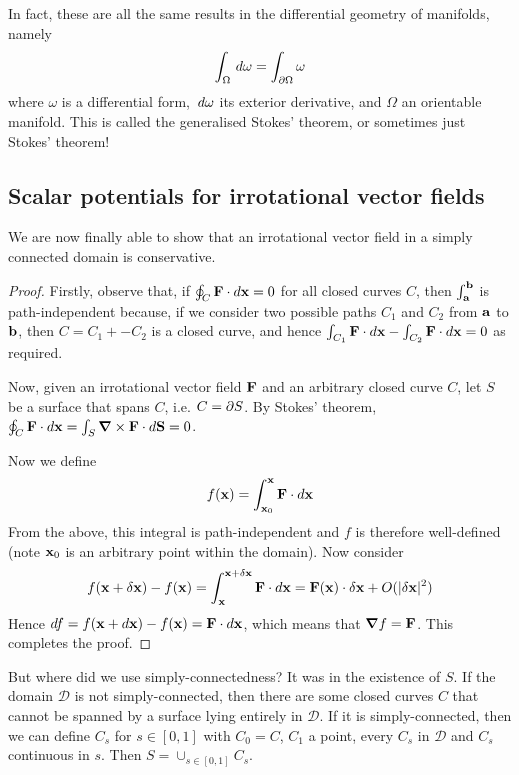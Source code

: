 \documentclass{../template/note}
\begin{document}
    In fact, these are all the same results in the differential geometry of manifolds, namely
    \begin{align*}
        \int_\Omega \,d{\omega} = \int_{\partial \Omega} \omega 
    \end{align*}
    where \(\omega\) is a differential form, \(\,d{\omega}\) its exterior derivative, and \(\Omega\) an orientable manifold. This is called the generalised Stokes' theorem, or sometimes just Stokes' theorem!
    
    \subsection{Scalar potentials for irrotational vector fields}

    We are now finally able to show that an irrotational vector field in a simply connected domain is conservative.

    \begin{proof}
        Firstly, observe that, if \(\oint_C \V F \cdot d\V x = 0\) for all closed curves \(C\), then \(\int_{\V a}^{\V b}\) is path-independent because, if we consider two possible paths \(C_1\) and \(C_2\) from \(\V a\) to \(\V b\), then \(C = C_1 + -C_2\) is a closed curve, and hence \(\int_{C_1} \V F \cdot d\V x - \int_{C_2} \V F \cdot d\V x = 0\) as required.

        Now, given an irrotational vector field \(\V F\) and an arbitrary closed curve \(C\), let \(S\) be a surface that spans \(C\), i.e. \(C = \partial S\). By Stokes' theorem, \(\oint_C \V F \cdot d\V x = \int_S \curl \V F \cdot d\V S = 0\).

        Now we define
        \begin{align*}
            f(\V x) = \int_{\V x_0}^{\V x} \V F \cdot d\V x
        \end{align*}
        From the above, this integral is path-independent and \(f\) is therefore well-defined (note \(\V x_0\) is an arbitrary point within the domain). Now consider
        \begin{align*}
            f(\V x + \delta \V x) - f(\V x) = \int_{\V x}^{\V x + \delta \V x} \V F \cdot d\V x = \V F(\V x) \cdot \delta \V x + O(|\delta \V x|^2)
        \end{align*}
        Hence \(df = f(\V x + d\V x) - f(\V x) = \V F \cdot d\V x\), which means that \(\grad f = \V F\). This completes the proof.
    \end{proof}
    
    \begin{remark*}
        But where did we use simply-connectedness? It was in the existence of \(S\). If the domain \(\mathscr D\) is not simply-connected, then there are some closed curves \(C\) that cannot be spanned by a surface lying entirely in \(\mathscr D\). If it is simply-connected, then we can define \(C_s\) for \(s \in [0, 1]\) with \(C_0 = C\), \(C_1\) a point, every \(C_s\) in \(\mathscr D\) and \(C_s\) continuous in \(s\). Then \(S = \cup_{s \in [0, 1]} C_s\).
    \end{remark*}
    
\end{document}
